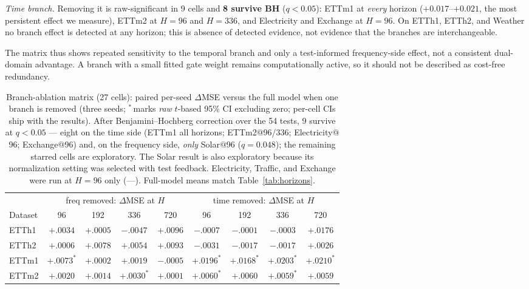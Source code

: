 \documentclass[review,12pt]{elsarticle}
\begin{document}
\emph{Time branch.} Removing it is raw-significant in 9 cells and \textbf{8
survive BH} ($q{<}0.05$): ETTm1 at \emph{every} horizon ($+0.017$--$+0.021$,
the most persistent effect we measure), ETTm2 at $H{=}96$ and $H{=}336$, and
Electricity and Exchange at $H{=}96$. On ETTh1, ETTh2, and Weather no branch
effect is detected at any horizon; this is absence of detected evidence, not
evidence that the branches are interchangeable.

The matrix thus shows repeated sensitivity to the temporal branch and only a
test-informed frequency-side effect, not a consistent dual-domain advantage.
A branch with a small fitted gate weight remains computationally active, so
it should not be described as cost-free redundancy.

\begin{table}[tb]
\centering
\caption{Branch-ablation matrix (27 cells): paired per-seed $\Delta$MSE
versus the full model when one branch is removed (three seeds;
$^{*}$\,marks \emph{raw} $t$-based 95\% CI excluding zero; per-cell CIs
ship with the results). After Benjamini--Hochberg correction over the 54
tests, 9 survive at $q{<}0.05$ --- eight on the time side (ETTm1 all
horizons; ETTm2$@$96/336; Electricity$@$96; Exchange$@$96) and, on the
frequency side, \emph{only} Solar$@$96 ($q{=}0.048$); the remaining
starred cells are exploratory. The Solar result is also exploratory because
its normalization setting was selected with test feedback. Electricity,
Traffic, and Exchange were run
at $H{=}96$ only (---). Full-model means match Table~\ref{tab:horizons}.}
\label{tab:branchmatrix}
\scriptsize
\setlength{\tabcolsep}{3.4pt}
\begin{tabular}{@{}lcccccccc@{}}
\toprule
& \multicolumn{4}{c}{freq removed: $\Delta$MSE at $H$}
& \multicolumn{4}{c}{time removed: $\Delta$MSE at $H$} \\
\cmidrule(lr){2-5}\cmidrule(l){6-9}
Dataset & 96 & 192 & 336 & 720 & 96 & 192 & 336 & 720 \\
\midrule
ETTh1 & $+.0034$ & $+.0005$ & $-.0047$ & $+.0096$ & $-.0007$ & $-.0001$ & $-.0003$ & $+.0176$ \\
ETTh2 & $+.0006$ & $+.0078$ & $+.0054$ & $+.0093$ & $-.0031$ & $-.0017$ & $-.0017$ & $+.0026$ \\
ETTm1 & $+.0073^{*}$ & $+.0002$ & $+.0019$ & $-.0005$ & $+.0196^{*}$ & $+.0168^{*}$ & $+.0203^{*}$ & $+.0210^{*}$ \\
ETTm2 & $+.0020$ & $+.0014$ & $+.0030^{*}$ & $+.0001$ & $+.0060^{*}$ & $+.0060$ & $+.0059^{*}$ & $+.0059$ \\

\end{tabular}
\end{table}
\end{document}
